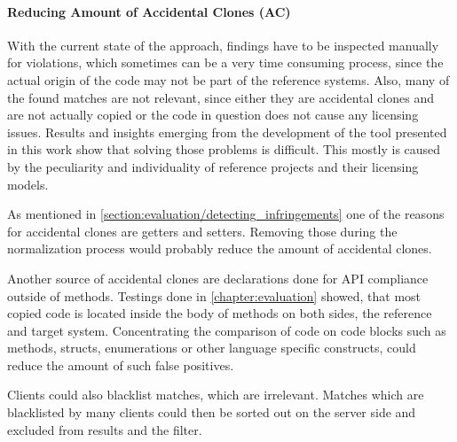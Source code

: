 \paragraph{Reducing Amount of Accidental Clones (AC)}
With the current state of the approach, findings have to be inspected manually for violations, which sometimes can be a very time consuming process, since the actual origin of the code may not be part of the reference systems.
Also, many of the found matches are not relevant, since either they are accidental clones and are not actually copied or the code in question does not cause any licensing issues.
Results and insights emerging from the development of the tool presented in this work show that solving those problems is difficult.
This mostly is caused by the peculiarity and individuality of reference projects and their licensing models.

As mentioned in \autoref{section:evaluation/detecting_infringements} one of the reasons for accidental clones are getters and setters.
Removing those during the normalization process would probably reduce the amount of accidental clones.

Another source of accidental clones are declarations done for API compliance outside of methods.
Testings done in \autoref{chapter:evaluation} showed, that most copied code is located inside the body of methods on both sides, the reference and target system.
Concentrating the comparison of code on code blocks such as methods, structs, enumerations or other language specific constructs, could reduce the amount of such false positives.

Clients could also blacklist matches, which are irrelevant.
Matches which are blacklisted by many clients could then be sorted out on the server side and excluded from results and the filter.

